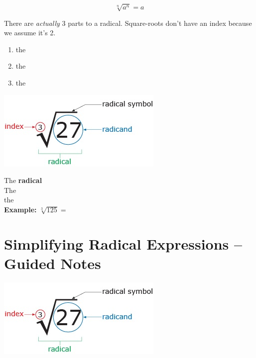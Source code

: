 \documentclass[12pt]{article}
\begin{document}
\begin{LARGE}
	$$\sqrt[n]{a^n}=a$$
\end{LARGE}



\hrulefill

There are \textit{actually} 3 parts to a radical. Square-roots don't have an index because we assume it's 2.

\begin{enumerate}

	\item the \\
	
	\item the \\
	
	\item the\\
\end{enumerate}

\begin{center}
\includegraphics[scale=.7]{radical.jpg}
\end{center}



The \textbf{radical} \\

The \\

the \\

\textbf{Example:} $\sqrt[3]{125}=$\\

\pagebreak

\section{Simplifying Radical Expressions -- Guided Notes}

\begin{center}
\includegraphics[scale=.7]{radical.jpg}\\
\end{center}
\end{document}
